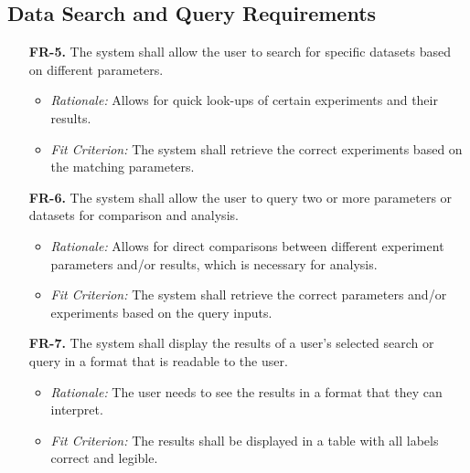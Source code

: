 \documentclass[12pt]{article}
\begin{document}
\subsection{Data Search and Query Requirements}
\begin{enumerate}
  \item[\textbf{FR-5.}] The system shall allow the user to search for specific
  datasets based on different parameters.
  \begin{itemize}
    \item \textit{Rationale:} Allows for quick look-ups of certain experiments
    and their results.
    \item \textit{Fit Criterion:} The system shall retrieve the correct
    experiments based on the matching parameters.
  \end{itemize}
  \item[\textbf{FR-6.}] The system shall allow the user to query two or more
  parameters or datasets for comparison and analysis.
  \begin{itemize}
    \item \textit{Rationale:} Allows for direct comparisons between different
    experiment parameters and/or results, which is necessary for analysis.
    \item \textit{Fit Criterion:} The system shall retrieve the correct
    parameters and/or experiments based on the query inputs.
  \end{itemize}
  \item[\textbf{FR-7.}] The system shall display the results of a user’s
  selected search or query in a format that is readable to the user.
  \begin{itemize}
    \item \textit{Rationale:} The user needs to see the results in a format that
    they can interpret.
    \item \textit{Fit Criterion:} The results shall be displayed in a table with
    all labels correct and legible.
  \end{itemize}
\end{enumerate}
\end{document}
